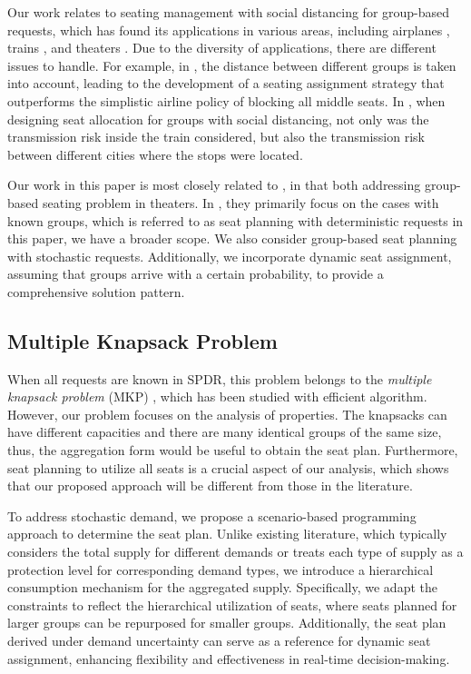 Our work relates to seating management with social distancing for group-based requests, which has found its applications in various areas, including airplanes \cite{salari2022social}, trains \cite{haque2023social}, and theaters \cite{blom2022filling}. Due to the diversity of applications, there are different issues to handle. For example, in \cite{salari2022social}, the distance between different groups is taken into account, leading to the development of a seating assignment strategy that outperforms the simplistic airline policy of blocking all middle seats. In \cite{haque2023social}, when designing seat allocation for groups with social distancing, not only was the transmission risk inside the train considered, but also the transmission risk between different cities where the stops were located.


Our work in this paper is most closely related to \cite{blom2022filling}, in that both addressing group-based seating problem in theaters. In \cite{blom2022filling}, they primarily focus on the cases with known groups, which is referred to as seat planning with deterministic requests in this paper, we have a broader scope. We also consider group-based seat planning with stochastic requests. Additionally, we incorporate dynamic seat assignment, assuming that groups arrive with a certain probability, to provide a comprehensive solution pattern.


\subsection{Multiple Knapsack Problem}
When all requests are known in SPDR, this problem belongs to the \textit{multiple knapsack problem} (MKP) \cite{ferreira1996solving, pisinger1999exact}, which has been studied with efficient algorithm. However, our problem focuses on the analysis of properties. The knapsacks can have different capacities and there are many identical groups of the same size, thus, the aggregation form would be useful to obtain the seat plan. Furthermore, seat planning to utilize all seats is a crucial aspect of our analysis, which shows that our proposed approach will be different from those in the literature.

To address stochastic demand, we propose a scenario-based programming approach \cite{feng2013scenario, casey2005scenario, henrion2018problem} to determine the seat plan. Unlike existing literature, which typically considers the total supply for different demands or treats each type of supply as a protection level for corresponding demand types, we introduce a hierarchical consumption mechanism for the aggregated supply. Specifically, we adapt the constraints to reflect the hierarchical utilization of seats, where seats planned for larger groups can be repurposed for smaller groups. Additionally, the seat plan derived under demand uncertainty can serve as a reference for dynamic seat assignment, enhancing flexibility and effectiveness in real-time decision-making.

